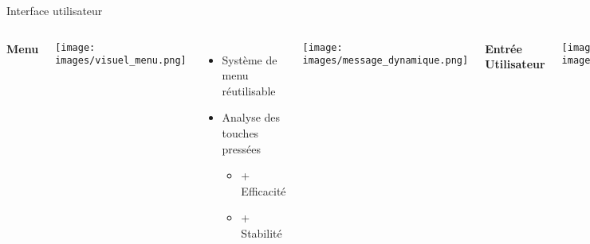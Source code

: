 \begin{frame}{Interface utilisateur}
    \begin{columns}[t]
        \textbf{Menu}
        \vspace{-0.5cm}
        \begin{center}
            \hspace*{-0.05\textwidth}
            \texttt{[image: images/visuel\_menu.png]}
        \end{center}
        \vspace{-0.2cm}
        \begin{itemize}
            \item Système de menu réutilisable
            \item Analyse des touches pressées
            \begin{itemize}
                \item + Efficacité
                \item + Stabilité
            \end{itemize}
        \end{itemize}
        \hspace*{-0.05\textwidth}
        \texttt{[image: images/message\_dynamique.png]}

        \textbf{Entrée Utilisateur}
        \begin{center}
            \texttt{[image: images/visuel\_auto\_completion.png]}
        \end{center}
        \begin{itemize}
            \item Sauvegarde dans fichiers texte
            \begin{itemize}
                \item IP / Ports / Nom / MDP
            \end{itemize}
        \end{itemize}
        \vspace*{-0.3cm}
        \begin{center}
            \texttt{[image: images/schema\_auto\_completion.png]}
        \end{center}
        \vspace{-0.1cm}
        \emph{Les dernières réponses sont aussi sauvegardées}

    \end{columns}
    
\end{frame}


